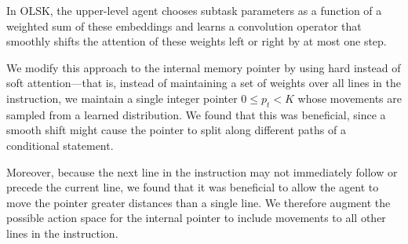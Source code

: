 \documentclass{article}
\begin{document}
In OLSK, the
upper-level agent chooses 
subtask parameters as a function of a weighted sum of these
embeddings and learns a convolution operator 
that smoothly shifts the attention of these weights left or right by at most one step.

We modify this approach to the internal memory pointer by using hard instead of
soft attention---that is, instead of maintaining a set of weights over all
lines in the instruction, we maintain a single integer pointer $0 \le p_t < K$ 
whose movements are sampled from a learned distribution. We found that this was beneficial, since a smooth shift might
cause the pointer to split along different paths of a conditional statement.

Moreover, because the next line in the instruction may not immediately follow or
precede the current line, we found that it was beneficial to allow the agent to
move the pointer greater distances than a single line. We therefore augment the
possible action space for the internal pointer to include movements to all other
lines in the instruction.
\end{document}

